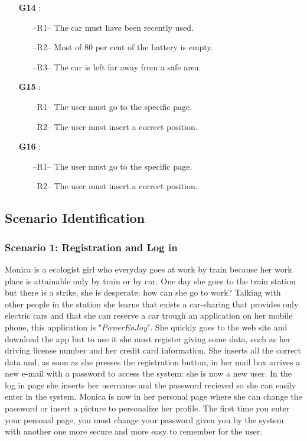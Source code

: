 \begin{itemize}
\item[\textbf{G14}]:
\begin{itemize}
\item[--R1--] The car must have been recently used.
\item[--R2--] Most of 80 per cent of the battery is empty.
\item[--R3--] The car is left far away from a safe area.
\end{itemize}


\item[\textbf{G15}]:
\begin{itemize}
\item[--R1--] The user must go to the specific page.
\item[--R2--] The user must insert a correct position. 
\end{itemize}


\item[\textbf{G16}]:
\begin{itemize}
\item[--R1--] The user must go to the specific page.
\item[--R2--] The user must insert a correct position.
\end{itemize}
\end{itemize}

\subsection{Scenario Identification} \label{sec:scenarios}
\subsubsection{Scenario 1: Registration and Log in} \label{sce1}
Monica is a ecologist girl who everyday goes at work by train because her work place is attainable only by train or by car. One day she goes to the train station but there is a strike, she is desperate: how can she go to work? Talking with other people in the station she learns that exists a car-sharing that provides only electric cars and that she can reserve a car trough an application on her mobile phone, this application is "\textit{PowerEnJoy}". She quickly goes to the web site and download the app but to use it she must register giving some data, such as her driving license number and her credit card information. She inserts all the correct data and, as soon as she presses the registration button, in her mail box arrives a new e-mail with a password to access the system: she is now a new user. In the log in page she inserts her username and the password recieved so she can easily enter in the system. Monica is now in her personal page where she can change the password or insert a picture to personalize her profile.
The first time you enter your personal page, you must change your password given you by the system with another one more secure and more easy to remember for the user.

